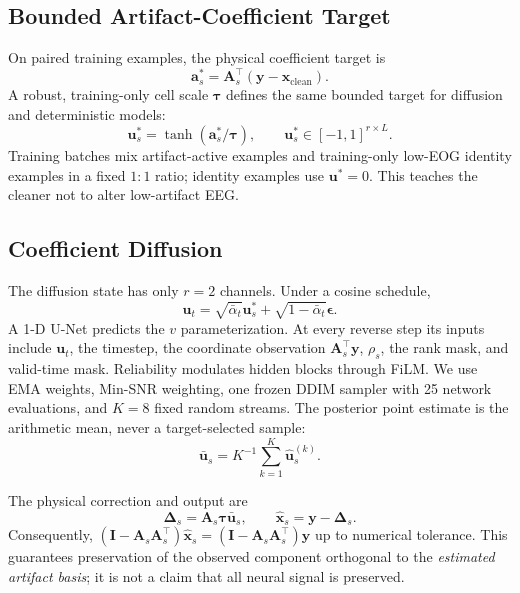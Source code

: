 \subsection{Bounded Artifact-Coefficient Target}
On paired training examples, the physical coefficient target is
\begin{equation}
  \mathbf{a}_s^*=\mathbf{A}_s^\top(\mathbf{y}-\mathbf{x}_{\mathrm{clean}}).
\end{equation}
A robust, training-only cell scale $\boldsymbol\tau$ defines the same bounded
target for diffusion and deterministic models:
\begin{equation}
  \mathbf{u}_s^*=\tanh(\mathbf{a}_s^*/\boldsymbol\tau),
  \qquad \mathbf{u}_s^*\in[-1,1]^{r\times L}.
  \label{eq:bounded_target}
\end{equation}
Training batches mix artifact-active examples and training-only low-EOG identity
examples in a fixed $1{:}1$ ratio; identity examples use $\mathbf{u}^*=0$.
This teaches the cleaner not to alter low-artifact EEG.

\subsection{Coefficient Diffusion}
The diffusion state has only $r=2$ channels.  Under a cosine schedule,
\begin{equation}
  \mathbf{u}_t=\sqrt{\bar\alpha_t}\mathbf{u}_s^*
  +\sqrt{1-\bar\alpha_t}\boldsymbol\epsilon.
\end{equation}
A 1-D U-Net predicts the $v$ parameterization.  At every reverse step its inputs
include $\mathbf{u}_t$, the timestep, the coordinate observation
$\mathbf{A}_s^\top\mathbf{y}$, $\rho_s$, the rank mask, and valid-time mask.
Reliability modulates hidden blocks through FiLM.  We use EMA weights,
Min-SNR weighting, one frozen DDIM sampler with 25 network evaluations, and
$K=8$ fixed random streams.  The posterior point estimate is the arithmetic
mean, never a target-selected sample:
\begin{equation}
  \bar{\mathbf{u}}_s=K^{-1}\sum_{k=1}^{K}\widehat{\mathbf{u}}_s^{(k)}.
\end{equation}

The physical correction and output are
\begin{equation}
  \boldsymbol\Delta_s=\mathbf{A}_s\boldsymbol\tau\bar{\mathbf{u}}_s,
  \qquad \widehat{\mathbf{x}}_s=\mathbf{y}-\boldsymbol\Delta_s.
  \label{eq:subspace_reconstruction}
\end{equation}
Consequently,
$(\mathbf{I}-\mathbf{A}_s\mathbf{A}_s^\top)\widehat{\mathbf{x}}_s
=(\mathbf{I}-\mathbf{A}_s\mathbf{A}_s^\top)\mathbf{y}$ up to numerical
tolerance.  This guarantees preservation of the observed component orthogonal
to the \emph{estimated artifact basis}; it is not a claim that all neural signal
is preserved.

